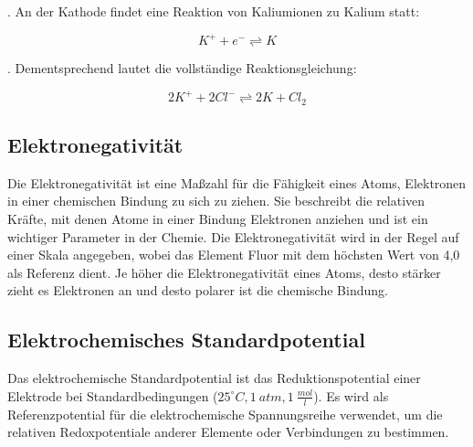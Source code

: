 \documentclass[11pt]{article}
\begin{document}
. An der Kathode findet eine Reaktion von Kaliumionen zu Kalium statt:
\begin{center}
    \begin{equation}
        K^{+} + e^{-} \rightleftharpoons K
    \end{equation}
\end{center}

. Dementsprechend lautet die vollständige Reaktionsgleichung:
\begin{center}
    \begin{equation}
        2 K^{+} + 2 Cl^{-} \rightleftharpoons 2 K + Cl_{2}
    \end{equation}
\end{center}

\subsection{Elektronegativität}
Die Elektronegativität ist eine Maßzahl für die Fähigkeit eines Atoms, Elektronen in einer chemischen Bindung zu sich zu ziehen. Sie beschreibt die relativen Kräfte, mit denen Atome in einer Bindung Elektronen anziehen und ist ein wichtiger Parameter in der Chemie. Die Elektronegativität wird in der Regel auf einer Skala angegeben, wobei das Element Fluor mit dem höchsten Wert von 4,0 als Referenz dient. Je höher die Elektronegativität eines Atoms, desto stärker zieht es Elektronen an und desto polarer ist die chemische Bindung.

\subsection{Elektrochemisches Standardpotential}
Das elektrochemische Standardpotential ist das Reduktionspotential einer Elektrode bei Standardbedingungen ($25^{\circ}C, 1 \:atm, 1 \:\frac{mol}{l}$). Es wird als Referenzpotential für die elektrochemische Spannungsreihe verwendet, um die relativen Redoxpotentiale anderer Elemente oder Verbindungen zu bestimmen.
\end{document}
